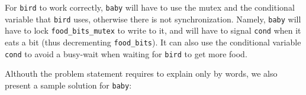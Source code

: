 \documentclass{sope}
\begin{document}
{





For \texttt{bird} to work correctly, \texttt{baby} will have to use the mutex and the conditional variable that \texttt{bird} uses, otherwise there is not synchronization. Namely, \texttt{baby} will have to lock \texttt{food\_bits\_mutex} to write to it, and will have to signal \texttt{cond} when it eats a bit (thus decrementing \texttt{food\_bits}). It can also use the conditional variable \texttt{cond} to avoid a busy-wait when waiting for \texttt{bird} to get more food.

Althouth the problem statement requires to explain only by words, we also present a sample solution for \texttt{baby}:





}
\end{document}
